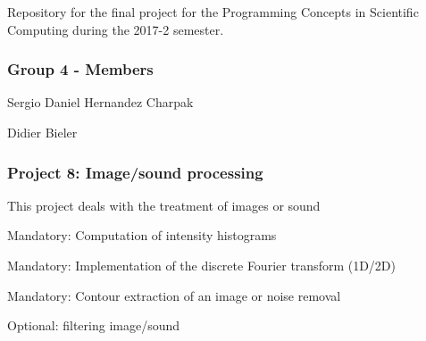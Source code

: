 Repository for the final project for the Programming Concepts in Scientific Computing during the 2017-\/2 semester. \subsubsection*{Group 4 -\/ Members}


\begin{DoxyEnumerate}
\item Sergio Daniel Hernandez Charpak
\item Didier Bieler \subsubsection*{Project 8\+: Image/sound processing}
\end{DoxyEnumerate}

This project deals with the treatment of images or sound


\begin{DoxyEnumerate}
\item Mandatory\+: Computation of intensity histograms
\end{DoxyEnumerate}


\begin{DoxyEnumerate}
\item Mandatory\+: Implementation of the discrete Fourier transform (1\+D/2D)
\end{DoxyEnumerate}


\begin{DoxyEnumerate}
\item Mandatory\+: Contour extraction of an image or noise removal
\end{DoxyEnumerate}


\begin{DoxyEnumerate}
\item Optional\+: filtering image/sound
\end{DoxyEnumerate}